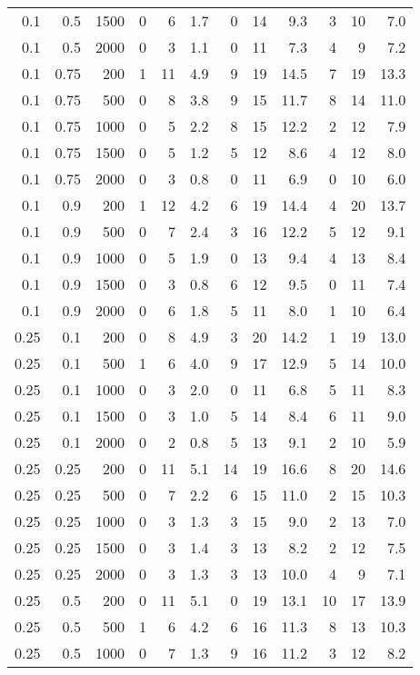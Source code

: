 \documentclass[a4paper, 12pt]{extreport}
\begin{document}
\begin{longtable}{|r|r|r|r|r|r|r|r|r|r|r|r|}
0.1 & 0.5 & 1500 & 0 & 6 & 1.7 & 0 & 14 & 9.3 & 3 & 10 & 7.0 \\ 
0.1 & 0.5 & 2000 & 0 & 3 & 1.1 & 0 & 11 & 7.3 & 4 & 9 & 7.2 \\ 
\hline
0.1 & 0.75 & 200 & 1 & 11 & 4.9 & 9 & 19 & 14.5 & 7 & 19 & 13.3 \\ 
0.1 & 0.75 & 500 & 0 & 8 & 3.8 & 9 & 15 & 11.7 & 8 & 14 & 11.0 \\ 
0.1 & 0.75 & 1000 & 0 & 5 & 2.2 & 8 & 15 & 12.2 & 2 & 12 & 7.9 \\ 
0.1 & 0.75 & 1500 & 0 & 5 & 1.2 & 5 & 12 & 8.6 & 4 & 12 & 8.0 \\ 
0.1 & 0.75 & 2000 & 0 & 3 & 0.8 & 0 & 11 & 6.9 & 0 & 10 & 6.0 \\ 
\hline
0.1 & 0.9 & 200 & 1 & 12 & 4.2 & 6 & 19 & 14.4 & 4 & 20 & 13.7 \\ 
0.1 & 0.9 & 500 & 0 & 7 & 2.4 & 3 & 16 & 12.2 & 5 & 12 & 9.1 \\ 
0.1 & 0.9 & 1000 & 0 & 5 & 1.9 & 0 & 13 & 9.4 & 4 & 13 & 8.4 \\ 
0.1 & 0.9 & 1500 & 0 & 3 & 0.8 & 6 & 12 & 9.5 & 0 & 11 & 7.4 \\ 
0.1 & 0.9 & 2000 & 0 & 6 & 1.8 & 5 & 11 & 8.0 & 1 & 10 & 6.4 \\ 
\hline
0.25 & 0.1 & 200 & 0 & 8 & 4.9 & 3 & 20 & 14.2 & 1 & 19 & 13.0 \\ 
0.25 & 0.1 & 500 & 1 & 6 & 4.0 & 9 & 17 & 12.9 & 5 & 14 & 10.0 \\ 
0.25 & 0.1 & 1000 & 0 & 3 & 2.0 & 0 & 11 & 6.8 & 5 & 11 & 8.3 \\ 
0.25 & 0.1 & 1500 & 0 & 3 & 1.0 & 5 & 14 & 8.4 & 6 & 11 & 9.0 \\ 
0.25 & 0.1 & 2000 & 0 & 2 & 0.8 & 5 & 13 & 9.1 & 2 & 10 & 5.9 \\ 
\hline
0.25 & 0.25 & 200 & 0 & 11 & 5.1 & 14 & 19 & 16.6 & 8 & 20 & 14.6 \\ 
0.25 & 0.25 & 500 & 0 & 7 & 2.2 & 6 & 15 & 11.0 & 2 & 15 & 10.3 \\ 
0.25 & 0.25 & 1000 & 0 & 3 & 1.3 & 3 & 15 & 9.0 & 2 & 13 & 7.0 \\ 
0.25 & 0.25 & 1500 & 0 & 3 & 1.4 & 3 & 13 & 8.2 & 2 & 12 & 7.5 \\ 
0.25 & 0.25 & 2000 & 0 & 3 & 1.3 & 3 & 13 & 10.0 & 4 & 9 & 7.1 \\ 
\hline
0.25 & 0.5 & 200 & 0 & 11 & 5.1 & 0 & 19 & 13.1 & 10 & 17 & 13.9 \\ 
0.25 & 0.5 & 500 & 1 & 6 & 4.2 & 6 & 16 & 11.3 & 8 & 13 & 10.3 \\ 
0.25 & 0.5 & 1000 & 0 & 7 & 1.3 & 9 & 16 & 11.2 & 3 & 12 & 8.2 \\ 

\end{longtable}
\end{document}
